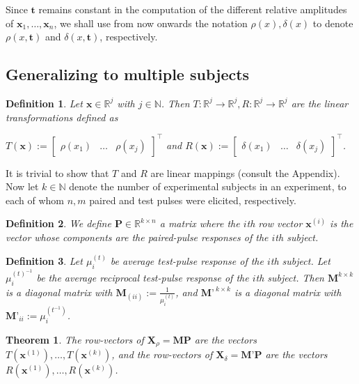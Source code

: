 \documentclass{article}
\newtheorem{definition}{Definition}
\newtheorem{theorem}{Theorem}
\begin{document}
\begin{multicols}{2}
Since $\textbf{t}$ remains constant in the computation of the different relative
amplitudes of $\textbf{x}_1, \ldots, \textbf{x}_n$, we shall use from now
onwards the notation $\rho(x), \delta(x)$ to denote $\rho(x, \textbf{t})$ and
$\delta(x, \textbf{t})$, respectively.

\subsection{Generalizing to multiple subjects}


\begin{definition}
    Let $\textbf{x} \in \mathbb{R}^j$ with $j \in \mathbb{N}$. Then $T:
    \mathbb{R}^j \to \mathbb{R}^j, R : \mathbb{R}^j \to \mathbb{R}^j$ are the
    linear transformations defined as

    $T(\textbf{x}) := \begin{bmatrix} 
        \rho(x_1) & \ldots & \rho(x_j)
    \end{bmatrix}^\intercal $ and $R(\textbf{x}) := \begin{bmatrix} 
        \delta(x_1) & \ldots & \delta(x_j) 
    \end{bmatrix}^\intercal $.
\end{definition}

It is trivial to show that $T$ and $R$ are linear mappings (consult the
Appendix). Now let $k \in \mathbb{N}$ denote the number of experimental subjects
in an experiment, to each of whom $n, m$ paired and test pulses were elicited,
respectively.

\begin{definition}
    We define $\textbf{P} \in \mathbb{R}^{k \times n}$ a
    matrix where the $i$th row vector $\textbf{x}^{(i)}$ is the vector whose
    components are the paired-pulse responses of the $i$th subject.
\end{definition}

\begin{definition}
    Let $\mu^{(t)}_i$ be average test-pulse response of the $i$th subject. Let
    $\mu^{(t)^{-1}}_i$ be the average \textit{reciprocal} test-pulse response of
    the $i$th subject. Then $\textbf{M}^{k \times k}$ is a diagonal matrix with
    $\textbf{M}_{(ii)} := \frac{1}{\mu^{(t)}_{i}}$, and $\textbf{M'}^{~ k \times
    k}$ is a diagonal matrix with $\textbf{M'}_{ii} := \mu^{(t^{-1})}_i$.
\end{definition}

\begin{theorem}
    The row-vectors of $\textbf{X}_\rho = \textbf{M}\textbf{P}$ are the
    vectors $T(\textbf{x}^{(1)}), \ldots, T(\textbf{x}^{(k)})$, and
    the row-vectors of $\textbf{X}_\delta = \textbf{M'}\textbf{P}$ 
    are the vectors $R(\textbf{x}^{(1)}), \ldots,
    R(\textbf{x}^{(k)})$.
\end{theorem}



\end{multicols}
\end{document}
